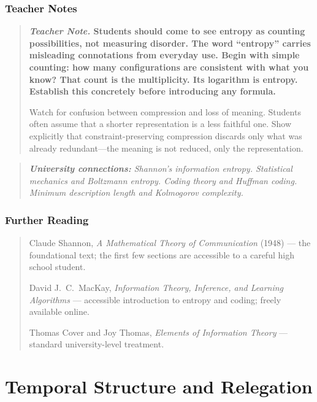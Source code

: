 \documentclass[11pt]{book}
\theoremstyle{plain}
\theoremstyle{definition}
\theoremstyle{remark}
\newenvironment{teachernote}
  {\begin{quote}\small\bfseries\textit{Teacher Note.}\normalfont\small\enspace\ignorespaces}
  {\end{quote}}
\newenvironment{universitybridge}
  {\begin{quote}\small\itshape\textbf{University connections:}\normalfont\small\itshape\enspace\ignorespaces}
  {\end{quote}}
\newenvironment{readinglist}
  {\begin{quote}\small}
  {\end{quote}}
\begin{document}
\section*{Teacher Notes}

\begin{teachernote}
Students should come to see entropy as counting possibilities, not
measuring disorder. The word ``entropy'' carries misleading connotations
from everyday use. Begin with simple counting: how many configurations
are consistent with what you know? That count is the multiplicity.
Its logarithm is entropy. Establish this concretely before introducing
any formula.

Watch for confusion between compression and loss of meaning. Students
often assume that a shorter representation is a less faithful one.
Show explicitly that constraint-preserving compression discards only
what was already redundant---the meaning is not reduced, only the
representation.
\end{teachernote}

\begin{universitybridge}
Shannon's information entropy. Statistical mechanics and Boltzmann
entropy. Coding theory and Huffman coding. Minimum description length
and Kolmogorov complexity.
\end{universitybridge}

\section*{Further Reading}

\begin{readinglist}
Claude Shannon, \textit{A Mathematical Theory of Communication} (1948)
--- the foundational text; the first few sections are accessible to a
careful high school student.

David J.~C.~MacKay, \textit{Information Theory, Inference, and
Learning Algorithms} --- accessible introduction to entropy and coding;
freely available online.

Thomas Cover and Joy Thomas, \textit{Elements of Information Theory}
--- standard university-level treatment.
\end{readinglist}

\part{Temporal Structure and Relegation}
\end{document}
